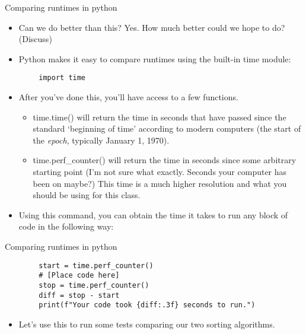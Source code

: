 \documentclass{beamer}
\begin{document}
\begin{frame}[fragile]{Comparing runtimes in python}
    \begin{itemize}
        \item Can we do better than this? Yes. How much better could we hope to do? (Discuss)
        \item Python makes it easy to compare runtimes using the built-in time module:
    \end{itemize}
    \begin{verbatim}
        import time
    \end{verbatim}
    \begin{itemize}
        \item After you've done this, you'll have access to a few functions.
        \begin{itemize}
            \item time.time() will return the time in seconds that have passed since the standard `beginning of time' according to modern computers (the start of the \emph{epoch}, typically January 1, 1970).
            \item time.perf\_counter() will return the time in seconds since some arbitrary starting point (I'm not sure what exactly. Seconds your computer has been on maybe?) This time is a much higher resolution and what you should be using for this class.
        \end{itemize}
        \item Using this command, you can obtain the time it takes to run any block of code in the following way:
    \end{itemize}
\end{frame}

\begin{frame}[fragile]{Comparing runtimes in python}
    \begin{verbatim}
        start = time.perf_counter()
        # [Place code here]
        stop = time.perf_counter()
        diff = stop - start
        print(f"Your code took {diff:.3f} seconds to run.")
    \end{verbatim}
    \begin{itemize}
        \item Let's use this to run some tests comparing our two sorting algorithms. 
    \end{itemize}
\end{frame}
\end{document}
